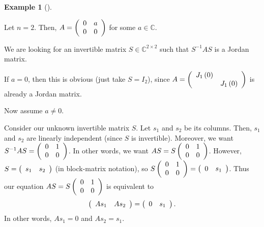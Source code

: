 \documentclass[numbers=enddot,12pt,final,onecolumn,notitlepage]{scrartcl}%
\numberwithin{exer}{subsection}
\theoremstyle{definition}
\newtheorem{exam}[theo]{Example}
\newenvironment{example}[1][]
{\begin{exam}[#1]\begin{leftbar}}
{\end{leftbar}\end{exam}}
\begin{document}
\begin{example}
Let $n=2$. Then, $A=\left(
\begin{array}
[c]{cc}%
0 & a\\
0 & 0
\end{array}
\right)  $ for some $a\in\mathbb{C}$.

We are looking for an invertible matrix $S\in\mathbb{C}^{2\times2}$ such that
$S^{-1}AS$ is a Jordan matrix.

If $a=0$, then this is obvious (just take $S=I_{2}$), since $A=\left(
\begin{array}
[c]{cc}%
J_{1}\left(  0\right)   & \\
& J_{1}\left(  0\right)
\end{array}
\right)  $ is already a Jordan matrix.

Now assume $a\neq0$.

Consider our unknown invertible matrix $S$. Let $s_{1}$ and $s_{2}$ be its
columns. Then, $s_{1}$ and $s_{2}$ are linearly independent (since $S$ is
invertible). Moreover, we want $S^{-1}AS=\left(
\begin{array}
[c]{cc}%
0 & 1\\
0 & 0
\end{array}
\right)  $. In other words, we want $AS=S\left(
\begin{array}
[c]{cc}%
0 & 1\\
0 & 0
\end{array}
\right)  $. However, $S=\left(
\begin{array}
[c]{cc}%
s_{1} & s_{2}%
\end{array}
\right)  $ (in block-matrix notation), so $S\left(
\begin{array}
[c]{cc}%
0 & 1\\
0 & 0
\end{array}
\right)  =\left(
\begin{array}
[c]{cc}%
0 & s_{1}%
\end{array}
\right)  $. Thus our equation $AS=S\left(
\begin{array}
[c]{cc}%
0 & 1\\
0 & 0
\end{array}
\right)  $ is equivalent to%
\[
\left(
\begin{array}
[c]{cc}%
As_{1} & As_{2}%
\end{array}
\right)  =\left(
\begin{array}
[c]{cc}%
0 & s_{1}%
\end{array}
\right)  .
\]
In other words, $As_{1}=0$ and $As_{2}=s_{1}$.


\end{example}
\end{document}
